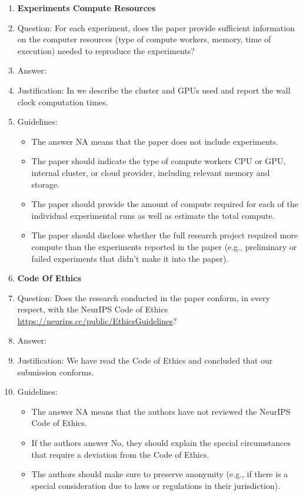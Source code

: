 \begin{enumerate}
\item {\bf Experiments Compute Resources}
\item[] Question: For each experiment, does the paper provide sufficient information on the computer resources (type of compute workers, memory, time of execution) needed to reproduce the experiments?
\item[] Answer: \answerYes{} %
\item[] Justification: \justificationTODO{}
  In  we describe the cluster and GPUs used and report the wall clock computation times.
\item[] Guidelines:
  \begin{itemize}
  \item The answer NA means that the paper does not include experiments.
  \item The paper should indicate the type of compute workers CPU or GPU, internal cluster, or cloud provider, including relevant memory and storage.
  \item The paper should provide the amount of compute required for each of the individual experimental runs as well as estimate the total compute.
  \item The paper should disclose whether the full research project required more compute than the experiments reported in the paper (e.g., preliminary or failed experiments that didn't make it into the paper).
  \end{itemize}

\item {\bf Code Of Ethics}
\item[] Question: Does the research conducted in the paper conform, in every respect, with the NeurIPS Code of Ethics \url{https://neurips.cc/public/EthicsGuidelines}?
\item[] Answer: \answerYes{}   %
\item[] Justification: We have read the Code of Ethics and concluded that our submission conforms.
\item[] Guidelines:
  \begin{itemize}
  \item The answer NA means that the authors have not reviewed the NeurIPS Code of Ethics.
  \item If the authors answer No, they should explain the special circumstances that require a deviation from the Code of Ethics.
  \item The authors should make sure to preserve anonymity (e.g., if there is a special consideration due to laws or regulations in their jurisdiction).
  \end{itemize}



\end{enumerate}
